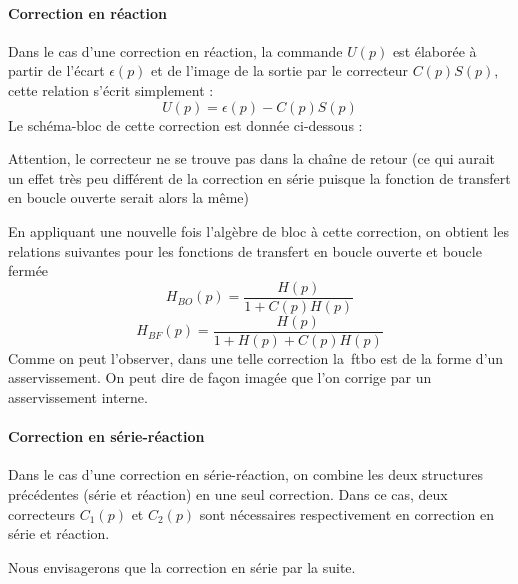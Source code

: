 \paragraph{Correction en réaction}
Dans le cas d'une correction en réaction, la commande $U(p)$ est élaborée 
à partir de l'écart $\epsilon(p)$ et de l'image de la sortie par le correcteur
$C(p)S(p)$, cette relation s'écrit simplement : 
\[
    U(p)=\epsilon(p)-C(p)S(p)
\]
Le schéma-bloc de cette correction est donnée ci-dessous :
\begin{center}
    
\end{center}
Attention, le correcteur ne se trouve pas dans la
chaîne de retour (ce qui aurait un effet très peu différent de la 
correction en série puisque la fonction de transfert en boucle ouverte serait
alors la même)  

En appliquant une nouvelle fois l'algèbre de bloc à cette correction, on
obtient les relations suivantes pour les fonctions de transfert en boucle 
ouverte et boucle fermée
\[
    H_{BO}(p)=\dfrac{H(p)}{1+C(p)H(p)}
\]
\[
    H_{BF}(p)=\dfrac{H(p)}{1+H(p)+C(p)H(p)}
\]
Comme on peut l'observer, dans une telle correction la~\gls{ftbo} est de la
forme d'un asservissement. On peut dire de façon imagée que l'on corrige par
un asservissement interne.
\paragraph{Correction en série-réaction}
Dans le cas d'une correction en série-réaction, on combine les deux structures
précédentes (série et réaction) en une seul correction. Dans ce cas, deux
correcteurs $C_1(p)$ et $C_2(p)$ sont nécessaires respectivement 
en correction en série et réaction.
\begin{center}
    
\end{center}
Nous envisagerons que la correction en série par la suite.
